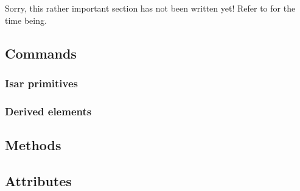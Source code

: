 Sorry, this rather important section has not been written yet!  Refer to
\cite{Wenzel:1999:TPHOL} for the time being.

\subsection{Commands}

\subsubsection{Isar primitives}

\subsubsection{Derived elements}


\subsection{Methods}

\subsection{Attributes}


